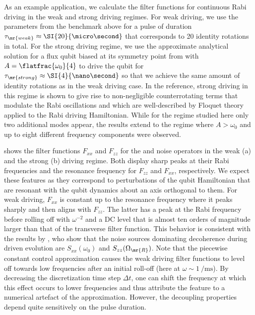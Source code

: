 As an example application, we calculate the filter functions for continuous Rabi driving in the weak and strong driving regimes. For weak driving, we use the parameters from the benchmark above for a pulse of duration $\tau_\mr{weak}\approx\SI{20}{\micro\second}$ that corresponds to \num{20} identity rotations in total. For the strong driving regime, we use the approximate analytical solution for a flux qubit biased at its symmetry point from  with $A = \flatfrac{\omega_0}{4}$ to drive the qubit for $\tau_\mr{strong}\approx\SI{4}{\nano\second}$ so that we achieve the same amount of identity rotations as in the weak driving case. In the reference, strong driving in this regime is shown to give rise to non-negligible counterrotating terms that modulate the Rabi oscillations and which are well-described by Floquet theory applied to the Rabi driving Hamiltonian. While for the regime studied here only two additional modes appear, the results extend to the regime where $A > \omega_0$ and up to eight different frequency components were observed.

 shows the filter functions $F_{xx}$ and $F_{zz}$ for the \px and \pz noise operators in the weak (a) and the strong (b) driving regime. Both display sharp peaks at their Rabi frequencies and the resonance frequency for $F_{zz}$ and $F_{xx}$, respectively. We expect these features as they correspond to perturbations of the qubit Hamiltonian that are resonant with the qubit dynamics about an axis orthogonal to them. For weak driving, $F_{xx}$ is constant up to the resonance frequency where it peaks sharply and then aligns with $F_{zz}$. The latter has a peak at the Rabi frequency before rolling off with $\omega^{-2}$ and a DC level that is almost ten orders of magnitude larger than that of the transverse filter function. This behavior is consistent with the results by \citeauthor{Yan2013}, who show that the noise sources dominating decoherence during driven evolution are $S_{xx}(\omega_0)$ and $S_{zz}(\Omega_\mr{R})$. Note that the piecewise constant control approximation causes the weak driving filter functions to level off towards low frequencies after an initial roll-off (here at $\omega\sim\SI{1}{\per\milli\second}$). By decreasing the discretization time step $\Delta t$, one can shift the frequency at which this effect occurs to lower frequencies and thus attribute the feature to a numerical artefact of the approximation. However, the decoupling properties depend quite sensitively on the pulse duration.

